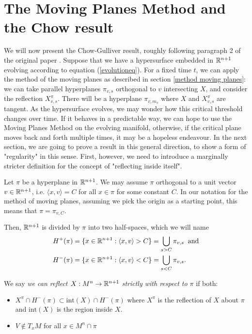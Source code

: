 \section{The Moving Planes Method and the Chow result}

We will now present the Chow-Gulliver result, roughly following paragraph 2 of the original paper \cite{Chow}.
Suppose that we have a hypersurface embedded in $\mathbb{R}^{n+1}$ evolving according to equation (\ref{evolutioneq}). For a fixed time $t$, we can apply the method of the moving planes as described in section \ref{method moving planes}: we can take parallel hyperplanes $\pi_{v,s}$ orthogonal to $v$ intersecting $X$, and consider the reflection  $X_{v,s}^\pi$. There will be a hyperplane $\pi_{v,m_v}$ where $X$ and $X_{v,s}^\pi$ are tangent. As the hypersurface evolves, we may wonder how this critical threshold changes over time. If it behaves in a predictable way, we can hope to use the Moving Planes Method on the evolving manifold, otherwise, if the critical plane moves back and forth multiple times, it may be a hopeless endeavour. In the next section, we are going to prove a result in this general direction, to show a form of "regularity" in this sense. First, however, we need to introduce a marginally stricter definition for the concept of "reflecting inside itself". 



Let $\pi$ be a hyperplane in $\mathbb{R}^{n+1}$. We may assume $\pi$ orthogonal to a unit vector $v\in\mathbb{R}^{n+1}$, i.e. $\langle x, v\rangle= C$ for all $x\in \pi$ for some constant $C$. In our notation for the method of moving planes, assuming we pick the origin as a starting point, this means that $\pi = \pi_{v, C}$. 

Then, $\mathbb{R}^{n+1}$ is divided by $\pi$ into two half-spaces, which we will name 
\begin{align*}
H^+(\pi)&=\{x \in \mathbb{R}^{n+1} : \langle x, v\rangle > C\}= \bigcup_{s>C} \pi_{v, s} \;\;\mathrm{and}\\
H^-(\pi)&=\{x \in \mathbb{R}^{n+1} : \langle x, v\rangle < C\}= \bigcup_{s<C} \pi_{v, s}.
\end{align*} 

\begin{defin}
	We say {\em we can reflect $X: M^n\rightarrow \mathbb{R}^{n+1}$ strictly with respect to $\pi$} if both:
	\begin{itemize}
		\item $X^\pi\cap H^-(\pi)\subset \mathrm{int}(X)\cap H^-(\pi)$ where $X^\pi$ is the reflection of $X$ about $\pi$ and $\mathrm{int}(X)$ is the region inside $X$.
		\item $V\notin T_xM$ for all $x\in M^n \cap\pi$
	\end{itemize} \label{strict-reflection-definition}
\end{defin}


